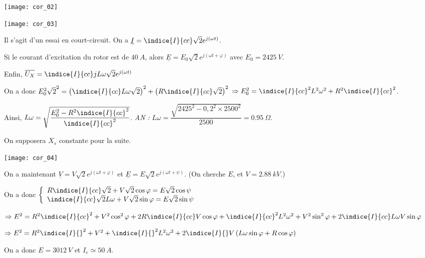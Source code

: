 \ifprof
\begin{marginfigure}
\texttt{[image: cor\_02]}

\texttt{[image: cor\_03]}
\end{marginfigure}
\begin{corrige}
Il s'agit d'un essai en court-circuit. 
On a $\underline{I}=\indice{I}{cc}\sqrt{2}e^{j\left(\omega t\right)}$.

Si le courant d'excitation du rotor est de $\SI{40}{A}$, alors $\underline{E}=E_0\sqrt{2}e^{j\left(\omega t + \varphi\right)}$ avec $E_0 = \SI{2425}{V}$.

Enfin, $\overline{U_X}=\indice{I}{cc}jL\omega\sqrt{2}e^{j\left(\omega t\right)}$


On a donc $E_0^2\sqrt{2}^2 = \left(\indice{I}{cc}L\omega\sqrt{2}\right)^2 + \left(R\indice{I}{cc}\sqrt{2}\right)^2$
$ \Rightarrow  E_0^2 = \indice{I}{cc}^2L^2\omega^2 + R^2\indice{I}{cc}^2$.

Ainsi, $L\omega = \sqrt{\dfrac{E_0^2-R^2\indice{I}{cc}^2}{\indice{I}{cc}^2}}$. \textit{AN :} $L\omega = \dfrac{\sqrt{2425^2-0,2^2\times 2500^2}}{2500} = \SI{0,95}{\Omega}$.
\end{corrige}
\else
\fi

On supposera $X_s$ constante pour la suite.

\ifprof
\begin{marginfigure}
\texttt{[image: cor\_04]}
\end{marginfigure}
\begin{corrige}
On a maintenant $\underline{V}=V\sqrt{2}e^{j\left(\omega t + \varphi\right)}$ et 
$\underline{E}=E\sqrt{2}e^{j\left(\omega t + \psi\right)}$. (On cherche $E$, et $V = \SI{2,88}{kV}$.)

On a donc 
$\left\{
\begin{array}{l}
R\indice{I}{cc}\sqrt{2} + V\sqrt{2}\cos \varphi = E\sqrt{2} \cos \psi\\
\indice{I}{cc}\sqrt{2}L\omega + V\sqrt{2}\sin \varphi = E\sqrt{2} \sin\psi \\
\end{array}
\right.$

$\Rightarrow
E^2 = R^2\indice{I}{cc}^2 + V^2\cos^2 \varphi + 2R\indice{I}{cc}V\cos \varphi
+\indice{I}{cc}^2L^2\omega^2 + V^2\sin^2 \varphi
+2\indice{I}{cc}L\omega  V\sin \varphi
$

$\Rightarrow
E^2 = R^2\indice{I}{}^2 + V^2 
+\indice{I}{}^2L^2\omega^2 +2\indice{I}{}V\left(L\omega  \sin \varphi+ R\cos \varphi\right)
$



On a donc $E = \SI{3012}{V}$ et $I_e \simeq \SI{50}{A}$.
\end{corrige}
\else
\fi

